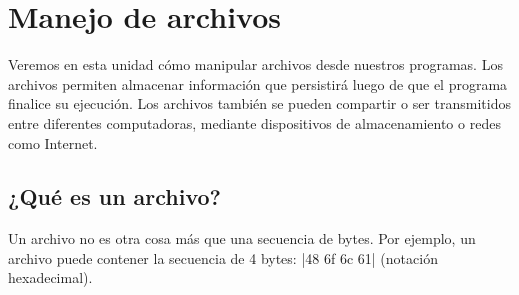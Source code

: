 \chapter{Manejo de archivos}
\label{uni:archivos}

Veremos en esta unidad cómo manipular archivos desde nuestros programas. Los
archivos permiten almacenar información que persistirá luego de que el programa
finalice su ejecución. Los archivos también se pueden compartir o ser
transmitidos entre diferentes computadoras, mediante dispositivos de
almacenamiento o redes como Internet.

\section{¿Qué es un archivo?}

Un archivo no es otra cosa más que una secuencia de bytes. Por ejemplo, un
archivo puede contener la secuencia de 4 bytes: |48 6f 6c 61| (notación
hexadecimal).

